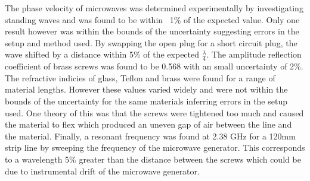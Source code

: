 \documentclass[12pt]{article}
\begin{document}
The phase velocity of microwaves was determined experimentally by investigating standing waves and was found to be within ~1\% of the expected value.
Only one result however was within the bounds of the uncertainty suggesting errors in the setup and method used.
By swapping the open plug for a short circuit plug, the wave shifted by a distance within 5\% of the expected $\frac{\lambda}{4}$.
The amplitude reflection coefficient of brass screws was found to be 0.568 with an small uncertainty of 2\%.
The refractive indicies of glass, Teflon and brass were found for a range of material lengths.
However these values varied widely and were not within the bounds of the uncertainty for the same materials inferring
errors in the setup used. One theory of this was that the screws were tightened too much and caused the material to flex which
produced an uneven gap of air between the line and the material.
Finally, a resonant frequency was found at 2.38 GHz for a 120mm strip line by sweeping the frequency of the microwave generator.
This corresponds to a wavelength 5\% greater than the distance between the screws which could be due to instrumental drift of the microwave generator.
\end{document}
